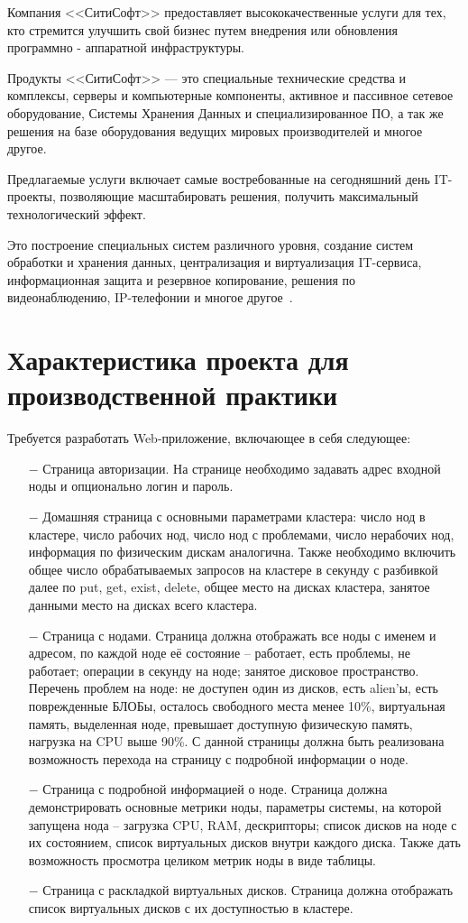 Компания <<СитиСофт>> предоставляет высококачественные услуги для тех, кто стремится улучшить свой бизнес путем внедрения или обновления программно - аппаратной инфраструктуры.

Продукты <<СитиСофт>> --- это специальные технические средства и комплексы, серверы и компьютерные компоненты, активное и пассивное сетевое оборудование, Системы Хранения Данных и специализированное ПО, а так же решения на базе оборудования ведущих мировых производителей и многое другое.

Предлагаемые услуги включает самые востребованные на сегодняшний день IT-проекты, позволяющие масштабировать решения, получить максимальный технологический эффект. 

Это построение специальных систем различного уровня, создание систем обработки и хранения данных, централизация и виртуализация IT-сервиса, информационная защита и резервное копирование, решения по видеонаблюдению, IP-телефонии и многое другое~\cite{citysoft}.

\clearpage

\section{Характеристика проекта для производственной практики}

Требуется разработать Web-приложение, включающее в себя следующее: 

\begin{enumerate}
  \item[$-$] Страница авторизации. На странице необходимо задавать адрес входной ноды и опционально логин и пароль.
  \item[$-$] Домашняя страница с основными параметрами кластера: число нод в кластере, число рабочих нод, число нод с проблемами, число нерабочих нод, информация по физическим дискам аналогична. Также необходимо включить общее число обрабатываемых запросов на кластере в секунду с разбивкой далее по put, get, exist, delete, общее место на дисках кластера, занятое данными место на дисках всего кластера. 
  \item[$-$] Страница с нодами. Страница должна отображать все ноды с именем и адресом, по каждой ноде её состояние -- работает, есть проблемы, не работает; операции в секунду на ноде; занятое дисковое пространство. Перечень проблем на ноде: не доступен один из дисков, есть alien’ы, есть поврежденные БЛОБы, осталось свободного места менее 10\%, виртуальная память, выделенная ноде, превышает доступную физическую память, нагрузка на CPU выше 90\%. С данной страницы должна быть реализована возможность перехода на страницу с подробной информации о ноде.
  \item[$-$] Страница с подробной информацией о ноде. Страница должна демонстрировать основные метрики ноды, параметры системы, на которой запущена нода -- загрузка CPU, RAM, дескрипторы; список дисков на ноде с их состоянием, список виртуальных дисков внутри каждого диска. Также дать возможность просмотра целиком метрик ноды в виде таблицы.
  \item[$-$] Страница с раскладкой виртуальных дисков. Страница должна отображать список виртуальных дисков с их доступностью в кластере.
\end{enumerate}

